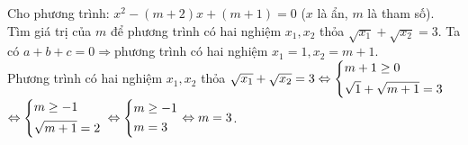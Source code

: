 \begin{ex}%
Cho phương trình: $x^2-( m+2)x+( m+1)=0$ ($x$ là ẩn, $m$ là tham số). Tìm giá trị của $m$ để phương trình có hai nghiệm $x_1,x_2$ thỏa $\sqrt{x_1}+\sqrt{x_2}=3$.
\loigiai
    {
    Ta có $a+b+c=0\Rightarrow $phương trình có hai nghiệm $x_1=1,x_2 =m+1$.\\
Phương trình có hai nghiệm $x_1,x_2$ thỏa $\sqrt{x_1}+\sqrt{x_2}=3\Leftrightarrow \left\{\begin{aligned}&m+1\ge 0\\&\sqrt{1}+\sqrt{m+1}=3\end{aligned}\right.$\\
$\Leftrightarrow \left\{\begin{aligned}&m\ge -1\\&\sqrt{m+1}=2\end{aligned}\right.$
$\Leftrightarrow \left\{\begin{aligned} &m\ge -1\\& m=3\end{aligned}\right.\Leftrightarrow m=3$.
    }
\end{ex}

